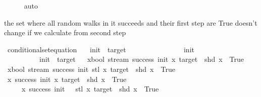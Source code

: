 \begin{isabellebody}
\ \ \ \ \isamarkupfalse%
\ auto\isanewline
{}\isamarkupfalse%
%
\endisatagproof
{\isafoldproof}%
%
\isadelimproof
%
\endisadelimproof
%
\isadelimdocument
%
\endisadelimdocument
%
\isatagdocument
%
\isamarkuptrue%
%
\endisatagdocument
{\isafolddocument}%
%
\isadelimdocument
%
\endisadelimdocument
%
\begin{isamarkuptext}%
the set where all random walks in it succeeds and their first step are True doesn't change if 
we calculate from second step%
\end{isamarkuptext}\isamarkuptrue%
\isamarkupfalse%
\ conditional{\isacharunderscore}{\kern0pt}set{\isacharunderscore}{\kern0pt}equation{\isacharcolon}{\kern0pt}\isanewline
\ \ \ init\ \ target\isanewline
\ \ \ \isanewline
\ \ \ \ \ \ \ \ \ \ {\isachardoublequoteopen}{}\ {\isacharless}{\kern0pt}\ init{\isachardoublequoteclose}\ \isanewline
\ \ \ \ \ \ \ \ \ \ {\isachardoublequoteopen}init\ {\isacharless}{\kern0pt}\ target{\isachardoublequoteclose}\isanewline
\ \ \isanewline
{\isachardoublequoteopen}{\isacharbraceleft}{\kern0pt}x{\isacharcolon}{\kern0pt}{\isacharcolon}{\kern0pt}bool\ stream{\isachardot}{\kern0pt}\ success\ init\ x\ target\ {\isasymand}\ shd\ x\ {\isacharequal}{\kern0pt}\ True{\isacharbraceright}{\kern0pt}\ {\isacharequal}{\kern0pt}\ \isanewline
\ {\isacharbraceleft}{\kern0pt}x{\isacharcolon}{\kern0pt}{\isacharcolon}{\kern0pt}bool\ stream{\isachardot}{\kern0pt}\ success\ {\isacharparenleft}{\kern0pt}init{\isacharplus}{\kern0pt}{}{\isacharparenright}{\kern0pt}\ {\isacharparenleft}{\kern0pt}stl\ x{\isacharparenright}{\kern0pt}\ target\ {\isasymand}\ shd\ x\ {\isacharequal}{\kern0pt}\ True{\isacharbraceright}{\kern0pt}{\isachardoublequoteclose}\isanewline
%
\isadelimproof
%
\endisadelimproof
%
\isatagproof
{}\isamarkupfalse%
\isanewline
\ \ \isamarkupfalse%
\ {\isachardoublequoteopen}{\isacharbraceleft}{\kern0pt}x{\isachardot}{\kern0pt}\ success\ init\ x\ target\ {\isasymand}\ shd\ x\ {\isacharequal}{\kern0pt}\ True{\isacharbraceright}{\kern0pt}\isanewline
\ \ \ \ {\isasymsubseteq}\ {\isacharbraceleft}{\kern0pt}x{\isachardot}{\kern0pt}\ success\ {\isacharparenleft}{\kern0pt}init\ {\isacharplus}{\kern0pt}\ {}{\isacharparenright}{\kern0pt}\ {\isacharparenleft}{\kern0pt}stl\ x{\isacharparenright}{\kern0pt}\ target\ {\isasymand}\ shd\ x\ {\isacharequal}{\kern0pt}\ True{\isacharbraceright}{\kern0pt}{\isachardoublequoteclose}\isanewline

\end{isabellebody}
